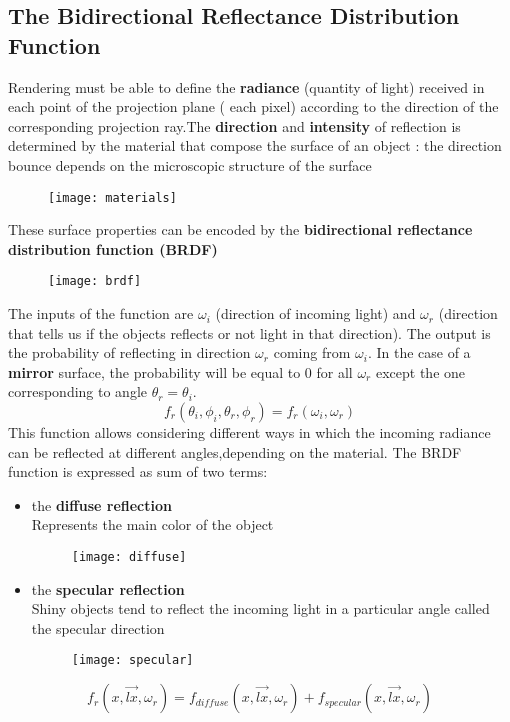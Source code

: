 \subsection{The Bidirectional Reflectance Distribution Function}
Rendering must be able to define the \textbf{radiance} (quantity of light) received in each point of the projection plane ( each pixel) according to the direction of the corresponding projection ray.The \textbf{direction} and \textbf{intensity} of reflection is determined by the material that compose the surface of an object : 
the direction bounce depends on the microscopic structure of the surface
\begin{figure}[H]
  \centering
  \texttt{[image: materials]}
\end{figure}
These surface properties can be encoded by the \textbf{bidirectional reflectance distribution function (BRDF)}
\begin{figure}[H]
  \centering
  \texttt{[image: brdf]}
\end{figure}
The inputs of the function are $\omega_i$ (direction of incoming light) and $\omega_r$ (direction that tells us if the objects reflects or not light in that direction). The output is the probability of reflecting in direction $\omega_r$ coming from $\omega_i$. In the case of a \textbf{mirror} surface, the probability will be equal to 0 for all $\omega_r$ except the one corresponding to angle $\theta_r = \theta_i$. $$ f_r(\theta_i,\phi_i,\theta_r,\phi_r)= f_r(\omega_i,\omega_r)$$
This function allows considering different ways in which the incoming radiance can be reflected at different angles,depending on the material.
The BRDF function is expressed as sum of two terms:
\begin{itemize}
\item the \textbf{diffuse reflection}\\
Represents the main color of the object 
\begin{figure}[H]
  \centering
  \texttt{[image: diffuse]}
\end{figure}
\item the \textbf{specular reflection}\\
Shiny objects tend to reflect the incoming light in a particular angle called the specular direction
\begin{figure}[H]
  \centering
  \texttt{[image: specular]}
\end{figure}
\end{itemize}
$$ f_r(x,\vec{lx},\omega_r)= f_{diffuse}(x,\vec{lx},\omega_r)+f_{specular}(x,\vec{lx},\omega_r)$$
